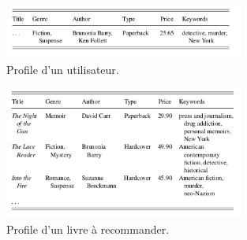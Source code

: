\documentclass[light]{ceri}
\begin{document}
\begin{center}
\begin{figure}
    \centering
    \includegraphics[width=0.7\textwidth]{images/profile_utilisateur.png} 
  \caption{Profile d'un utilisateur.}
    \label{profile_utilisateur}

\end{figure}   
\end{center}



\begin{center}
\begin{figure}
    \centering
    \includegraphics[width=0.7\textwidth]{images/profile_livres.png} 
  \caption{Profile d'un livre à recommander.}
    \label{profile_livre}

\end{figure}   
\end{center}
\end{document}

